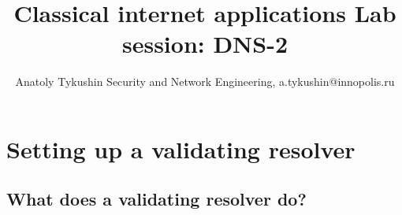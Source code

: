 \documentclass[a4paper]{article}
\title{Classical internet applications
\newline Lab session: DNS-2}
\author{Anatoly Tykushin \small { Security and Network Engineering, a.tykushin@innopolis.ru}}
\begin{document}
\maketitle
\tableofcontents 

\section{Setting up a validating resolver}
\subsection{What does a validating resolver do?}


\enddocument
\end{document}

